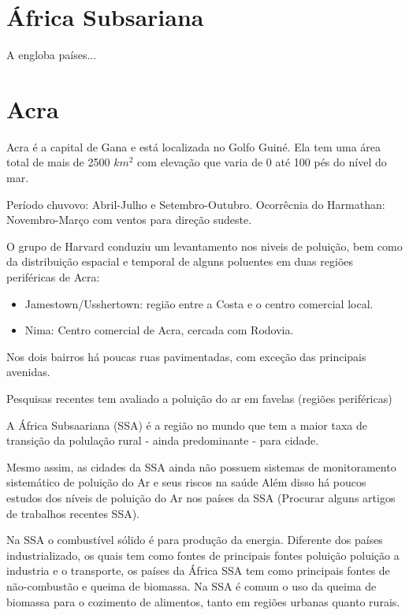 \section{África Subsariana}

A engloba países...

\section{Acra}

Acra é a capital  de Gana e está localizada no Golfo Guiné. Ela tem uma área 
total de mais de 2500 $km^2$ com elevação que varia de 0 até 100 pés do nível 
do mar. 

Período chuvovo: Abril-Julho e Setembro-Outubro. 
Ocorrêcnia do Harmathan: Novembro-Março com ventos para direção sudeste.

O grupo de Harvard \citep{ARKU2008} conduziu um levantamento nos niveis de 
poluição, bem como da distribuição espacial e temporal de alguns poluentes 
em duas regiões periféricas de Acra: 

\begin{itemize}
  \item Jamestown/Usshertown: região entre a Costa e o centro comercial local.
  \item Nima: Centro comercial de Acra, cercada com Rodovia.
\end{itemize} 

Nos dois bairros há poucas ruas pavimentadas, com exceção das principais 
avenidas. 

Pesquisas recentes tem avaliado a poluição do ar em favelas (regiões periféricas) 

A África Subsaariana (SSA) é a região no mundo que tem a maior taxa de transição da 
polulação rural - ainda predominante - para cidade. %

Mesmo assim, as cidades da SSA ainda não possuem sistemas de monitoramento sistemático de 
poluição do Ar e seus riscos na saúde %
Além disso há poucos estudos dos níveis de poluição do Ar nos países da SSA 
(Procurar alguns artigos de trabalhos recentes SSA).

Na SSA o combustível sólido é para produção da energia.
Diferente dos países industrializado, os quais tem como fontes de principais fontes 
poluição poluição a industria e o transporte, os países da África SSA tem como principais 
fontes de não-combustão e queima de biomassa. Na SSA é comum o uso da queima de biomassa 
para o cozimento de alimentos, tanto em regiões urbanas quanto rurais. %
